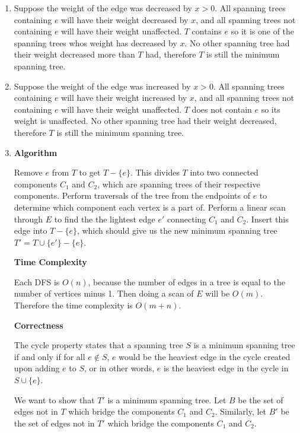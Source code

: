 \documentclass{article}
\begin{document}
\begin{solution}
\begin{enumerate}[label = (\alph*)]
    \item Suppose the weight of the edge was decreased by $x> 0$. 
    All spanning trees containing $e$ will have their weight decreased by $x$, 
    and all spanning trees not containing $e$ will have their weight unaffected.
    $T$ contains $e$ so it is one of the spanning trees whos weight has decreased by $x$.
    No other spanning tree had their weight decreased more than $T$ had, therefore $T$ is still the minimum spanning tree.

    \item Suppose the weight of the edge was increased by $x > 0$.
    All spanning trees containing $e$ will have their weight increased by $x$,
    and all spanning trees not containing $e$ will have their weight unaffected.
    $T$ does not contain $e$ so its weight is unaffected. 
    No other spanning tree had their weight decreased, therefore $T$ is still the minimum spanning tree.

    \item 
    
    \textbf{Algorithm}
    
    Remove $e$ from $T$ to get $T-\{e\}$. This divides $T$ into two connected components $C_1$ and $C_2$, which are spanning trees of their respective components.
    Perform traversals of the tree from the endpoints of $e$ to determine which component each vertex is a part of.
    Perform a linear scan through $E$ to find the the lightest edge $e'$ connecting $C_1$ and $C_2$.
    Insert this edge into $T-\{e\}$, which should give us the new minimum spanning tree $T'=T\cup\{e'\}-\{e\}$.

    \textbf{Time Complexity}

    Each DFS is $O(n)$, because the number of edges in a tree is equal to the number of vertices minus 1. 
    Then doing a scan of $E$ will be $O(m)$.
    Therefore the time complexity is $O(m + n)$.

    \textbf{Correctness}

    The cycle property states that a spanning tree $S$ is a minimum spanning tree if 
    and only if for all $e\notin S$, $e$ would be the heaviest edge in the cycle created upon adding $e$ to $S$, or in other words, $e$ is the heaviest edge in the cycle in $S\cup\{e\}$.

    We want to show that $T'$ is a minimum spanning tree.
    Let $B$ be the set of edges not in $T$ which bridge the components $C_1$ and $C_2$.
    Similarly, let $B'$ be the set of edges not in $T'$ which bridge the components $C_1$ and $C_2$.
    

\end{enumerate}
\end{solution}
\end{document}
